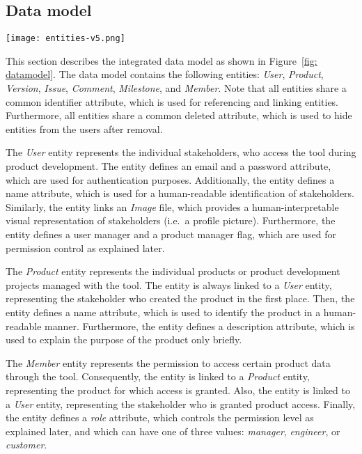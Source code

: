 \subsection{Data model}

\begin{figure*}[ht]
    \centering
    \texttt{[image: entities-v5.png]}
    \caption{Integrated data model for improved information exchange between customers, project managers, requirements engineers, and product designers}
    \label{fig: datamodel}
\end{figure*}

This section describes the integrated data model as shown in Figure~\ref{fig: datamodel}.
The data model contains the following entities: \textit{User}, \textit{Product}, \textit{Version}, \textit{Issue}, \textit{Comment}, \textit{Milestone}, and \textit{Member}.
Note that all entities share a common identifier attribute, which is used for referencing and linking entities.
Furthermore, all entities share a common deleted attribute, which is used to hide entities from the users after removal.

The \textit{User} entity represents the individual stakeholders, who access the tool during product development.
The entity defines an email and a password attribute, which are used for authentication purposes.
Additionally, the entity defines a name attribute, which is used for a human-readable identification of stakeholders.
Similarly, the entity links an \textit{Image} file, which provides a human-interpretable visual representation of stakeholders (i.e.\ a profile picture).
Furthermore, the entity defines a user manager and a product manager flag, which are used for permission control as explained later.

The \textit{Product} entity represents the individual products or product development projects managed with the tool.
The entity is always linked to a \textit{User} entity, representing the stakeholder who created the product in the first place.
Then, the entity defines a name attribute, which is used to identify the product in a human-readable manner.
Furthermore, the entity defines a description attribute, which is used to explain the purpose of the product only briefly.

The \textit{Member} entity represents the permission to access certain product data through the tool.
Consequently, the entity is linked to a \textit{Product} entity, representing the product for which access is granted.
Also, the entity is linked to a \textit{User} entity, representing the stakeholder who is granted product access.
Finally, the entity defines a \textit{role} attribute, which controls the permission level as explained later, and which can have one of three values: \textit{manager}, \textit{engineer}, or \textit{customer}.

